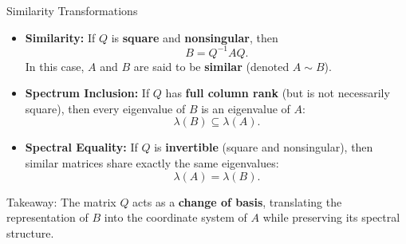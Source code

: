 \begin{frame}[t,fragile]{Similarity Transformations}
    \begin{itemize}
        \item \textbf{Similarity:}
              If $Q$ is \textbf{square} and \textbf{nonsingular}, then
              \[
                  B = Q^{-1} A Q .
              \]
              In this case, $A$ and $B$ are said to be \textbf{similar}
              (denoted $A \sim B$).

              \medskip

        \item \textbf{Spectrum Inclusion:}
              If $Q$ has \textbf{full column rank} (but is not necessarily square),
              then every eigenvalue of $B$ is an eigenvalue of $A$:
              \[
                  \lambda(B) \subseteq \lambda(A).
              \]

              \medskip

        \item \textbf{Spectral Equality:}
              If $Q$ is \textbf{invertible} (square and nonsingular), then similar matrices
              share exactly the same eigenvalues:
              \[
                  \lambda(A) = \lambda(B).
              \]

    \end{itemize}

    \begin{alertblock}{Takeaway:}\smallskip
        The matrix $Q$ acts as a \textbf{change of basis}, translating the
        representation of $B$ into the coordinate system of $A$ while preserving
        its spectral structure.
    \end{alertblock}
    \vfill

\end{frame}


